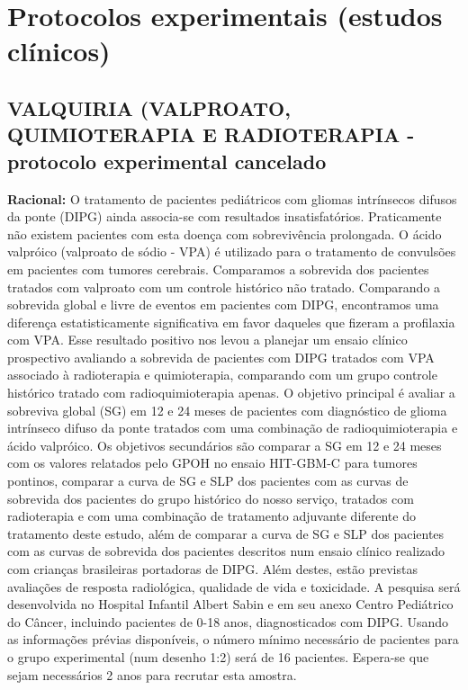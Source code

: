 \documentclass[11pt,a4paper,oldfontcommands]{memoir}
\begin{document}
\chapter{Protocolos experimentais (estudos clínicos)}
\cleardoublepage

\section{VALQUIRIA (VALPROATO, QUIMIOTERAPIA E RADIOTERAPIA - protocolo experimental cancelado}
{\let\thefootnote\relax{}}

\textbf{Racional:} O tratamento de pacientes pediátricos com gliomas intrínsecos difusos da
ponte (DIPG) ainda associa-se com resultados insatisfatórios.
Praticamente não existem pacientes com esta doença com sobrevivência
prolongada. O ácido valpróico (valproato de sódio - VPA) é utilizado
para o tratamento de convulsões em pacientes com tumores cerebrais.
Comparamos a sobrevida dos pacientes tratados com valproato com um
controle histórico não tratado. Comparando a sobrevida global e livre de
eventos em pacientes com DIPG, encontramos uma diferença
estatisticamente significativa em favor daqueles que fizeram a
profilaxia com VPA. Esse resultado positivo nos levou a planejar um
ensaio clínico prospectivo avaliando a sobrevida de pacientes com DIPG
tratados com VPA associado à radioterapia e quimioterapia, comparando
com um grupo controle histórico tratado com radioquimioterapia apenas. O
objetivo principal é avaliar a sobreviva global (SG) em 12 e 24 meses de
pacientes com diagnóstico de glioma intrínseco difuso da ponte tratados
com uma combinação de radioquimioterapia e ácido valpróico. Os objetivos
secundários são comparar a SG em 12 e 24 meses com os valores relatados
pelo GPOH no ensaio HIT-GBM-C para tumores pontinos, comparar a curva de
SG e SLP dos pacientes com as curvas de sobrevida dos pacientes do grupo
histórico do nosso serviço, tratados com radioterapia e com uma
combinação de tratamento adjuvante diferente do tratamento deste estudo,
além de comparar a curva de SG e SLP dos pacientes com as curvas de
sobrevida dos pacientes descritos num ensaio clínico realizado com
crianças brasileiras portadoras de DIPG. Além destes, estão previstas
avaliações de resposta radiológica, qualidade de vida e toxicidade. A
pesquisa será desenvolvida no Hospital Infantil Albert Sabin e em seu
anexo Centro Pediátrico do Câncer, incluindo pacientes de 0-18 anos,
diagnosticados com DIPG. Usando as informações prévias disponíveis, o
número mínimo necessário de pacientes para o grupo experimental (num
desenho 1:2) será de 16 pacientes. Espera-se que sejam necessários 2
anos para recrutar esta amostra.
\end{document}
